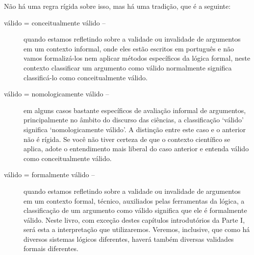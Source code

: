 Não há uma regra rígida sobre isso, mas há uma tradição, que é a seguinte:
\begin{description}
	\item[válido = conceitualmente válido --] quando estamos refletindo sobre a validade ou invalidade de argumentos em um contexto informal, onde eles estão escritos em português e não vamos formalizá-los nem aplicar métodos específicos da lógica formal, neste contexto classificar um argumento como válido normalmente significa classificá-lo como conceitualmente válido.
	\item[válido = nomologicamente válido --] em alguns casos bastante específicos de avaliação informal de argumentos, principalmente no âmbito do discurso das ciências, a classificação `válido' significa `nomologicamente válido'.
	A distinção entre este caso e o anterior não é rígida.
	Se você não tiver certeza de que o contexto científico se aplica, adote o entendimento mais liberal do caso anterior e entenda válido como conceitualmente válido.
	\item[válido = formalmente válido --] quando estamos refletindo sobre a validade ou invalidade de argumentos em um contexto formal, técnico, auxiliados pelas ferramentas da lógica, a classificação de um argumento como válido significa que ele é formalmente válido.
	Neste livro, com exceção destes capítulos introdutórios da Parte I, será esta a interpretação que utilizaremos.
	Veremos, inclusive, que como há diversos sistemas lógicos diferentes, haverá também diversas validades formais diferentes.
\end{description}


